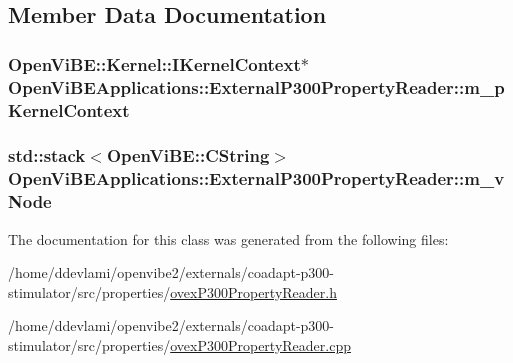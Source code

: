 \subsection{Member Data Documentation}
\hypertarget{classOpenViBEApplications_1_1ExternalP300PropertyReader_afc976fc78245cb44a0e66f93dcd543cb}{
\subsubsection[{m\_\-pKernelContext}]{\setlength{\rightskip}{0pt plus 5cm}OpenViBE::Kernel::IKernelContext$\ast$ {\bf OpenViBEApplications::ExternalP300PropertyReader::m\_\-pKernelContext}}}
\label{classOpenViBEApplications_1_1ExternalP300PropertyReader_afc976fc78245cb44a0e66f93dcd543cb}
\hypertarget{classOpenViBEApplications_1_1ExternalP300PropertyReader_ae1eb64666a2b0da436dffb55d0e79177}{
\subsubsection[{m\_\-vNode}]{\setlength{\rightskip}{0pt plus 5cm}std::stack$<$OpenViBE::CString$>$ {\bf OpenViBEApplications::ExternalP300PropertyReader::m\_\-vNode}}}
\label{classOpenViBEApplications_1_1ExternalP300PropertyReader_ae1eb64666a2b0da436dffb55d0e79177}


The documentation for this class was generated from the following files:\begin{DoxyCompactItemize}
\item 
/home/ddevlami/openvibe2/externals/coadapt-\/p300-\/stimulator/src/properties/\hyperlink{ovexP300PropertyReader_8h}{ovexP300PropertyReader.h}\item 
/home/ddevlami/openvibe2/externals/coadapt-\/p300-\/stimulator/src/properties/\hyperlink{ovexP300PropertyReader_8cpp}{ovexP300PropertyReader.cpp}\end{DoxyCompactItemize}
